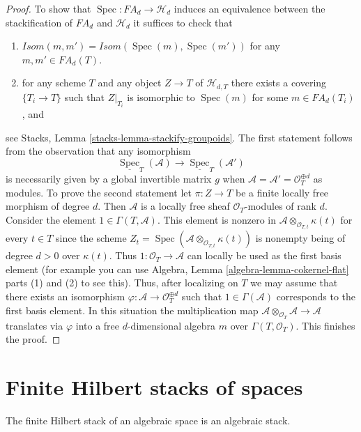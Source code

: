 \documentclass{stacks-project}
\theoremstyle{plain}
\theoremstyle{definition}
\theoremstyle{remark}
\numberwithin{equation}{subsection}
\def\Spec{\mathop{\mathrm{Spec}}}
\begin{document}
\begin{proof}
\medskip\noindent
To show that $\Spec : FA_d \to \mathcal{H}_d$ induces an equivalence
between the stackification of $FA_d$ and $\mathcal{H}_d$ it suffices to
check that
\begin{enumerate}
\item $\mathit{Isom}(m, m') = \mathit{Isom}(\Spec(m), \Spec(m'))$
for any $m, m' \in FA_d(T)$.
\item for any scheme $T$ and any object $Z \to T$ of $\mathcal{H}_{d, T}$
there exists a covering $\{T_i \to T\}$ such that $Z|_{T_i}$ is
isomorphic to $\Spec(m)$ for some $m \in FA_d(T_i)$, and
\end{enumerate}
see
Stacks, Lemma \ref{stacks-lemma-stackify-groupoids}.
The first statement follows from the observation that any isomorphism
$$
\underline{\Spec}_T(\mathcal{A})
\longrightarrow
\underline{\Spec}_T(\mathcal{A}')
$$
is necessarily given by a global invertible matrix $g$ when
$\mathcal{A} = \mathcal{A}' = \mathcal{O}_T^{\oplus d}$ as modules.
To prove the second statement let $\pi : Z \to T$ be a finite
locally free morphism of degree $d$. Then $\mathcal{A}$ is a locally
free sheaf $\mathcal{O}_T$-modules of rank $d$.
Consider the element $1 \in \Gamma(T, \mathcal{A})$. This element is
nonzero in $\mathcal{A} \otimes_{\mathcal{O}_{T, t}} \kappa(t)$
for every $t \in T$ since the scheme
$Z_t = \Spec(\mathcal{A} \otimes_{\mathcal{O}_{T, t}} \kappa(t))$
is nonempty being of degree $d > 0$ over $\kappa(t)$. Thus
$1 : \mathcal{O}_T \to \mathcal{A}$ can locally be used as the first
basis element (for example you can use
Algebra, Lemma \ref{algebra-lemma-cokernel-flat} parts (1) and (2)
to see this). Thus, after localizing on
$T$ we may assume that there exists an isomorphism
$\varphi : \mathcal{A} \to \mathcal{O}_T^{\oplus d}$
such that $1 \in \Gamma(\mathcal{A})$ corresponds to the first basis element.
In this situation the multiplication map
$\mathcal{A} \otimes_{\mathcal{O}_T} \mathcal{A} \to \mathcal{A}$
translates via $\varphi$ into a free $d$-dimensional algebra $m$ over
$\Gamma(T, \mathcal{O}_T)$. This finishes the proof.
\end{proof}




\section{Finite Hilbert stacks of spaces}
\label{section-spaces-hilbert}

\noindent
The finite Hilbert stack of an algebraic space is an algebraic stack.
\end{document}
